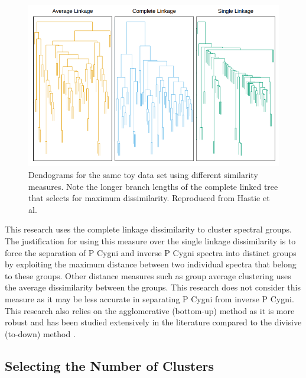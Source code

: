 \begin{figure}[!htb]
\centering
\includegraphics[scale=0.60]{figures/complete linkage.png}
\caption{Dendograms for the same toy data set using different similarity measures. Note the longer branch lengths of the complete linked tree that selects for maximum dissimilarity. Reproduced from Hastie et al.\cite{hastie2009elements}}
\end{figure}

This research uses the complete linkage dissimilarity to cluster spectral groups. The justification for using this measure over the single linkage dissimilarity is to force the separation of P Cygni and inverse P Cygni spectra into distinct groups by exploiting the maximum distance between two individual spectra that belong to these groups. Other distance measures such as group average clustering uses the average dissimilarity between the groups. This research does not consider this measure as it may be less accurate in separating P Cygni from inverse P Cygni. This research also relies on the agglomerative (bottom-up) method as it is more robust and has been studied extensively in the literature compared to the divisive (to-down) method \cite{hastie2009elements}.

\subsection{Selecting the Number of Clusters}

